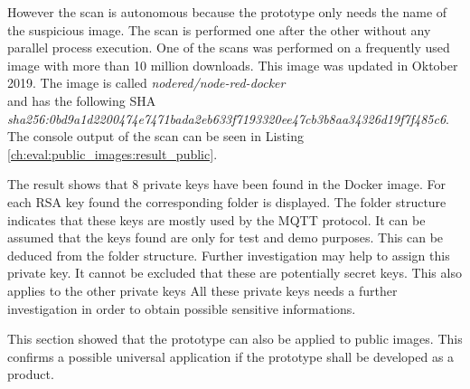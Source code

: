 However the scan is autonomous because the prototype only needs the name of the suspicious image.
The scan is performed one after the other without any parallel process execution.
One of the scans was performed on a frequently used image with more than 10 million downloads.
This image was updated in Oktober 2019. 
The image is called \textit{nodered/node-red-docker} \\and has the following SHA \\\textit{sha256:0bd9a1d2200474e7471bada2eb633f7193320ee47cb3b8aa34326d19f7f485c6}.
\\The console output of the scan can be seen in Listing \ref{ch:eval:public_images:result_public}.

The result shows that 8 private keys have been found in the Docker image.
For each RSA key found the corresponding folder is displayed.
The folder structure indicates that these keys are mostly used by the MQTT protocol.
It can be assumed that the keys found are only for test and demo purposes. This can be deduced from the folder structure.
Further investigation may help to assign this private key. 
It cannot be excluded that these are potentially secret keys.
This also applies to the other private keys
All these private keys needs a further investigation in order to obtain possible sensitive informations.

This section showed that the prototype can also be applied to public images.
This confirms a possible universal application if the prototype shall be developed as a product. 
